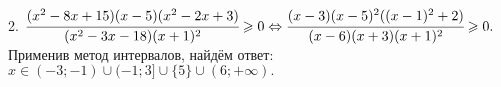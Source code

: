 2. $\cfrac{(x^2-8x+15)(x-5)(x^2-2x+3)}{(x^2-3x-18)(x+1)^2}\geqslant0\Leftrightarrow\cfrac{(x-3)(x-5)^2((x-1)^2+2)}{(x-6)(x+3)(x+1)^2}\geqslant0.$ Применив метод интервалов, найдём ответ: $x\in(-3;-1)\cup(-1;3]\cup\{5\}\cup(6;+\infty).$
\begin{figure}[ht!]
\end{figure}\\
